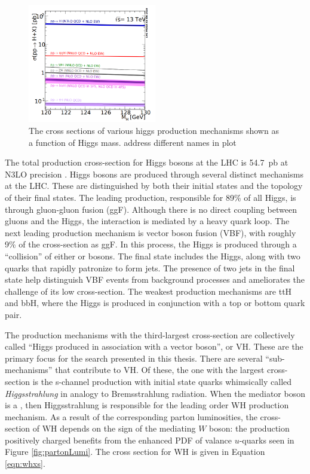 \begin{figure}[h!]
\captionsetup[subfigure]{position=b}
\centering
\includegraphics[width=0.5\textwidth]{figures/pheno/higgsXsec.png}
\caption{The cross sections of various higgs production mechanisms shown as a function of Higgs mass. {\color{red} address different names in plot} \cite{higgsCross}}
\label{fig:higgsCrossSection}
\end{figure}

The total production cross-section for Higgs bosons at the LHC is 54.7~pb at N3LO precision \cite{higgsCross}.
Higgs bosons are produced through several distinct mechanisms at the LHC.
These are distinguished by both their initial states and the topology of their final states.
The leading production, responsible for 89\% of all Higgs, is through gluon-gluon fusion (ggF).
Although there is no direct coupling between gluons and the Higgs, the interaction is mediated by a heavy quark loop.
The next leading production mechanism is vector boson fusion (VBF), with roughly 9\% of the cross-section as ggF.
In this process, the Higgs is produced through a ``collision'' of either \W or \Z bosons.
The final state includes the Higgs, along with two quarks that rapidly patronize to form jets.
The presence of two jets in the final state help distinguish VBF events from background processes and ameliorates the challenge of its low cross-section.
The weakest production mechanisms are ttH and bbH, where the Higgs is produced in conjunction with a top or bottom quark pair.

The production mechanisms with the third-largest cross-section are collectively called ``Higgs produced in association with a vector boson'', or VH.
These are the primary focus for the \hmm search presented in this thesis.
There are several ``sub-mechanisms'' that contribute to VH.
Of these, the one with the largest cross-section is the s-channel production with initial state quarks whimsically called \emph{Higgsstrahlung} in analogy to Bremsstrahlung radiation.
When the mediator boson is a \W, then Higgsstrahlung is responsible for the leading order WH production mechanism.
As a result of the corresponding parton luminosities, the cross-section of WH depends on the sign of the mediating $W$ boson: the production positively charged \Wp benefits from the enhanced PDF of valance $u$-quarks seen in Figure \ref{fig:partonLumi}. \check
The cross section for WH is given in Equation \ref{eqn:whxs}.


